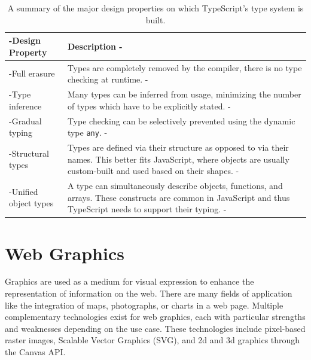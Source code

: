 \begin{table}[tp]
\tablestretch
{}
\centering
\begin{tabularx}{\linewidth}{>{\kern-\tabcolsep}lX<{\kern-\tabcolsep}}
\toprule
Design Property & Description \\
\midrule
Full erasure         &
Types are completely removed by the compiler, there is no type checking at runtime. \\
%
Type inference       &
Many types can be inferred from usage, minimizing the number of types which have to be explicitly stated. \\
%
Gradual typing       &
Type checking can be selectively prevented using the dynamic type \lstinline{any}. \\
%
Structural types     &
Types are defined via their structure as opposed to via their names.
This better fits JavaScript, where objects are usually custom-built and used based on their shapes. \\
%
Unified object types &
A type can simultaneously describe objects, functions, and arrays.
These constructs are common in JavaScript and thus TypeScript needs to support their typing. \\
\bottomrule
\end{tabularx}
\caption[TypeScript Type System Design Properties]{
A summary of the major design properties on which TypeScript's type system is built.
}
\label{tab:TSTypeSystemDesignProperties}
\end{table}









\section{Web Graphics}
\label{sec:WebGraphics}

Graphics are used as a medium for visual expression to enhance the
representation of information on the web. There are many fields of
application like the integration of maps, photographs, or charts in a
web page. Multiple complementary technologies exist for web graphics,
each with particular strengths and weaknesses depending on the use
case. These technologies include pixel-based raster images, Scalable
Vector Graphics (SVG), and 2d and 3d graphics through the Canvas API.



